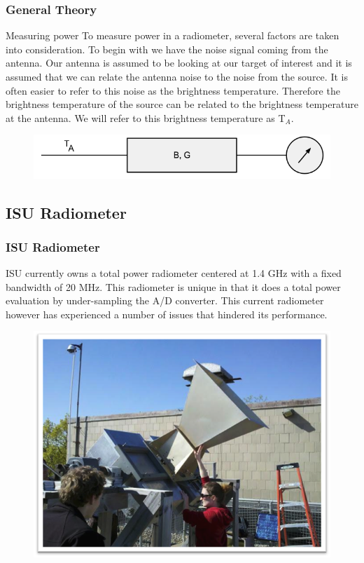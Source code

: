 \documentclass{beamer}
\begin{document}
\begin{frame}
\frametitle{General Theory}
\begin{block}{Measuring power}
To measure power in a radiometer, several factors are taken into consideration.  To begin with we have the noise signal coming from the antenna.  Our antenna is assumed to be looking at our target of interest and it is assumed that we can relate the antenna noise to the noise from the source.  It is often easier to refer to this noise as the brightness temperature.  Therefore the brightness temperature of the source can be related to the brightness temperature at the antenna.  We will refer to this brightness temperature as T$_{A}$.  

{\begin{figure}[h!tb] 
\centering
\includegraphics[width=\textwidth]{../Images/simple_rad.png}
\label{simplerad}
\end{figure}
}
\end{block}
\end{frame}

\subsection{ISU Radiometer}
\begin{frame}
\frametitle{ISU Radiometer}
\begin{block}{}
ISU currently owns a total power radiometer centered at 1.4 GHz with a fixed bandwidth of 20 MHz.  This radiometer is unique in that it does a total power evaluation by under-sampling the A/D converter.  This current radiometer however has experienced a number of issues that hindered its performance.  
\end{block}

\begin{figure}\label{agronomy_roof}
\includegraphics[width=0.45\linewidth]{images/agronomy_roof.png}
\end{figure}
\end{frame}
\end{document}
